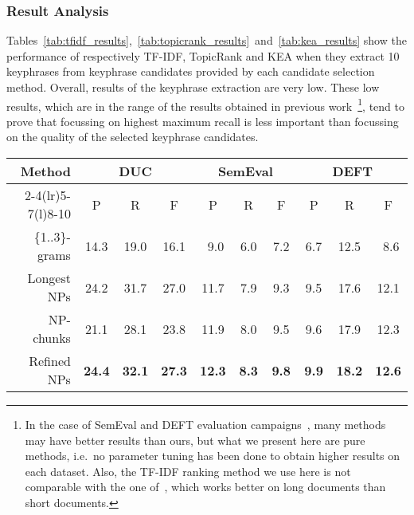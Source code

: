     \subsubsection{Result Analysis}
    \label{subsubsec:candidate_extraction_result_analysis}
      Tables~\ref{tab:tfidf_results},~\ref{tab:topicrank_results}~and~\ref{tab:kea_results}
      show the performance of respectively TF-IDF, TopicRank and KEA when they
      extract 10 keyphrases from keyphrase candidates provided by each candidate
      selection method. Overall, results of the keyphrase extraction are very
      low. These low results, which are in the range of the results obtained in
      previous
      work~\cite{hassan2010conundrums,kim2010semeval,paroubek2012deft}\footnote{In
      the case of SemEval and DEFT evaluation
      campaigns~\cite{kim2010semeval,paroubek2012deft}, many methods may have
      better results than ours, but what we present here are pure methods,
      i.e.~no parameter tuning has been done to obtain higher results on each
      dataset. Also, the TF-IDF ranking method we use here is not comparable
      with the one of~, which works better on long
      documents than short documents.}, tend to prove that focussing on highest
      maximum recall is less important than focussing on the quality of the
      selected keyphrase candidates.
      \begin{table*}
        \centering
        \begin{tabular}{@{}rccccccccc@{}}
          \toprule
          \multirow{2}{*}[-2pt]{\textbf{Method}} & \multicolumn{3}{c}{\textbf{DUC}} & \multicolumn{3}{c}{\textbf{SemEval}} & \multicolumn{3}{c}{\textbf{DEFT}}\\
          \cmidrule(r){2-4}\cmidrule(lr){5-7}\cmidrule(l){8-10}
          & P & R & F & P & R & F & P & R & F\\
          \midrule
          \{1..3\}-grams & 14.3 & 19.0 & 16.1 & $~~$9.0 & $~~$6.0 & $~~$7.2 & $~~$6.7 & 12.5 & $~~$8.6\\
          Longest NPs & 24.2 & 31.7 & 27.0 & 11.7 & $~~$7.9 & $~~$9.3 & $~~$9.5 & 17.6 & 12.1\\
          NP-chunks & 21.1 & 28.1 & 23.8 & 11.9 & $~~$8.0 & $~~$9.5 & $~~$9.6 & 17.9 & 12.3\\
          Refined NPs & \textbf{24.4} & \textbf{32.1} & \textbf{27.3} & \textbf{12.3} & \textbf{$~~$8.3} & \textbf{$~~$9.8} & \textbf{$~~$9.9} & \textbf{18.2} & \textbf{12.6}\\
          \bottomrule
        \end{tabular}
        \caption{Comparison of candidate selection methods, when 10 keyphrases
                 are extracted by \textbf{TF-IDF}.
                 \label{tab:tfidf_results}}
      \end{table*}
